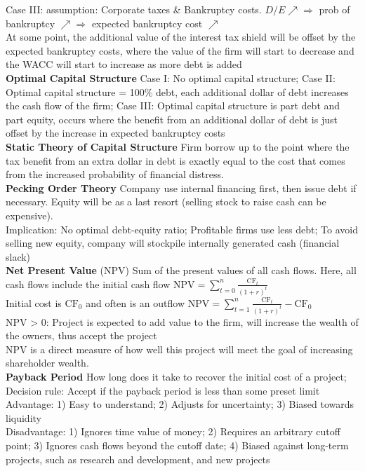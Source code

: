 \documentclass[12pt,landscape, a4paper]{article}
\theoremstyle{remark}
\begin{document}
\begin{multicols*}{3}
Case III: assumption: Corporate taxes \& Bankruptcy costs. $D/E \nearrow \Rightarrow$ prob of bankruptcy $\nearrow \Rightarrow$ expected bankruptcy cost $\nearrow$\\
At some point, the additional value of the interest tax shield will be offset by the expected bankruptcy costs, where the value of the firm will start to decrease and the WACC will start to increase as more debt is added\\
\textbf{Optimal Capital Structure} Case I: No optimal capital structure; Case II: Optimal capital structure = 100\% debt, each additional dollar of debt increases the cash flow of the firm; Case III: Optimal capital structure is part debt and part equity, occurs where the benefit from an additional dollar of debt is just offset by the increase in expected bankruptcy costs\\

\textbf{Static Theory of Capital Structure} Firm borrow up to the point where the tax benefit from an extra dollar in debt is exactly equal to the cost that comes from the increased probability of financial distress.\\

\textbf{Pecking Order Theory} Company use internal financing first, then issue debt if necessary. Equity will be as a last resort (selling stock to raise cash can be expensive).\\
Implication: No optimal debt-equity ratio; Profitable firms use less debt; To avoid selling new equity, company will stockpile internally generated cash (financial slack)\\

\textbf{Net Present Value} (NPV) Sum of the present values of all cash flows. Here, all cash flows include the initial cash flow $\mathrm{NPV} = \sum^n_{t=0} \frac{\mathrm{CF}_t}{(1+r)^t}$\\
Initial cost is $\mathrm{CF}_0$ and often is an outflow $\mathrm{NPV} = \sum^n_{t=1} \frac{\mathrm{CF}_t}{(1+r)^t} - \mathrm{CF}_0$\\
NPV > 0: Project is expected to add value to the firm, will increase the wealth of the owners, thus accept the project\\
NPV is a direct measure of how well this project will meet the goal of increasing shareholder wealth.\\

\textbf{Payback Period} How long does it take to recover the initial cost of a 
project; Decision rule: Accept if the payback period is less than some preset limit\\
Advantage: 1) Easy to understand; 2) Adjusts for uncertainty; 3) Biased towards liquidity\\
Disadvantage: 1) Ignores time value of money; 2) Requires an arbitrary cutoff point; 3) Ignores cash flows beyond the cutoff date; 4) Biased against long-term projects, such as research and development, and new projects\\


\end{multicols*}
\end{document}
